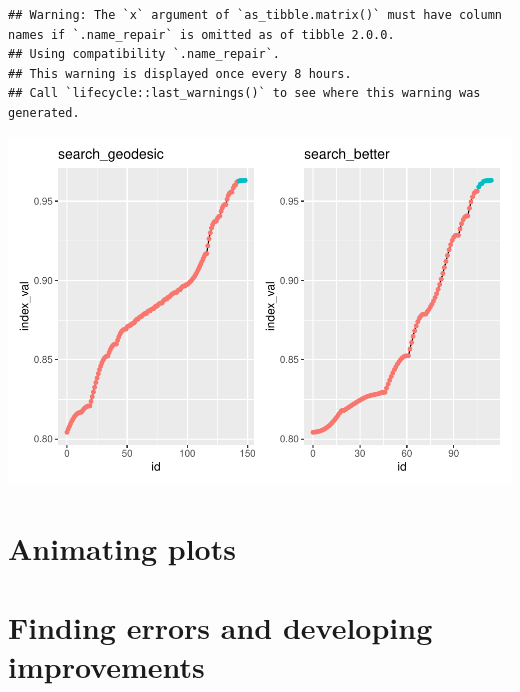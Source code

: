 \documentclass[12pt]{article}
\newenvironment{Shaded}{\begin{snugshade}}{\end{snugshade}}
\newcommand{\DataTypeTok}[1]{\textcolor[rgb]{0.13,0.29,0.53}{#1}}
\newcommand{\KeywordTok}[1]{\textcolor[rgb]{0.13,0.29,0.53}{\textbf{#1}}}
\newcommand{\NormalTok}[1]{#1}
\newcommand{\OperatorTok}[1]{\textcolor[rgb]{0.81,0.36,0.00}{\textbf{#1}}}
\newcommand{\OtherTok}[1]{\textcolor[rgb]{0.56,0.35,0.01}{#1}}
\newcommand{\StringTok}[1]{\textcolor[rgb]{0.31,0.60,0.02}{#1}}
\begin{document}
\begin{Shaded}
\end{Shaded}

\begin{verbatim}
## Warning: The `x` argument of `as_tibble.matrix()` must have column names if `.name_repair` is omitted as of tibble 2.0.0.
## Using compatibility `.name_repair`.
## This warning is displayed once every 8 hours.
## Call `lifecycle::last_warnings()` to see where this warning was generated.
\end{verbatim}

\includegraphics{paper_files/figure-latex/unnamed-chunk-10-1.pdf}

\hypertarget{animating-plots}{%
\section{Animating plots}\label{animating-plots}}

\begin{Shaded}
\end{Shaded}

\hypertarget{finding-errors-and-developing-improvements}{%
\section{Finding errors and developing
improvements}\label{finding-errors-and-developing-improvements}}
\end{document}
